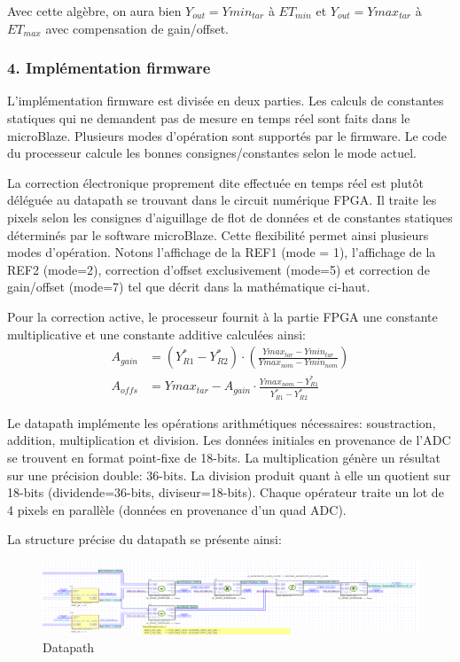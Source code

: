 \documentclass[11pt]{report}
\newcommand{\ftwo}{\left(\frac{Ymax_{tar}-Ymin_{tar}}{Ymax_{nom}-Ymin_{nom}}\right)}
\begin{document}
Avec cette algèbre, on aura bien $Y_{out}=Ymin_{tar}$ à $ET_{min}$ et $Y_{out}=Ymax_{tar}$ à $ET_{max}$ avec compensation de gain/offset.

\subsubsection{4. Implémentation firmware}
L'implémentation firmware est divisée en deux parties. Les calculs de constantes statiques qui ne demandent pas de mesure en temps réel sont faits dans le microBlaze. Plusieurs modes d'opération sont supportés par le firmware. Le code du processeur calcule les bonnes consignes/constantes selon le mode actuel.

La correction électronique proprement dite effectuée en temps réel est plutôt déléguée au datapath se trouvant dans le circuit numérique FPGA. Il traite les pixels selon les consignes d'aiguillage de flot de données et de constantes statiques déterminés par le software microBlaze. Cette flexibilité permet ainsi plusieurs modes d'opération. Notons l'affichage de la REF1 (mode = 1), l'affichage de la REF2 (mode=2), correction d'offset exclusivement (mode=5) et correction de gain/offset (mode=7) tel que décrit dans la mathématique ci-haut.

Pour la correction active, le processeur fournit à la partie FPGA une constante multiplicative et une constante additive calculées ainsi:
\begin{align*}
A_{gain} &= (Y_{R1}^*-Y_{R2}^*)\cdot\ftwo\\
A_{offs} &= Ymax_{tar}-A_{gain}\cdot{}\frac{Ymax_{nom}-Y_{R1}^*}{Y_{R1}^*-Y_{R2}^*}\
\end{align*}

Le datapath implémente les opérations arithmétiques nécessaires: soustraction, addition, multiplication et division. Les données initiales en provenance de l'ADC se trouvent en format point-fixe de 18-bits. La multiplication génère un résultat sur une précision double: 36-bits. La division produit quant à elle un quotient sur 18-bits (dividende=36-bits, diviseur=18-bits). Chaque opérateur traite un lot de 4 pixels en parallèle (données en provenance d'un quad ADC).

La structure précise du datapath se présente ainsi:

\begin{figure}[ht]
  \centering
  \includegraphics[width=1.2\textwidth]{datapath}
  \caption{Datapath}
  \label{fig:datapath}
\end{figure}
\end{document}
